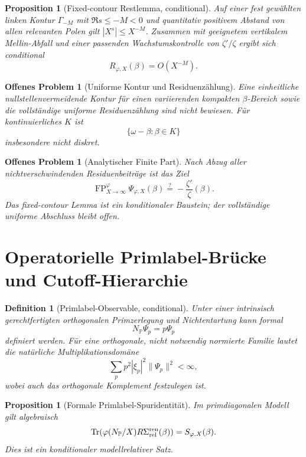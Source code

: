 \documentclass[11pt,a4paper]{amsart}
\newtheorem{proposition}[theorem]{Proposition}
\newtheorem{definition}[theorem]{Definition}
\newtheorem{openproblem}[theorem]{Offenes Problem}
\newcommand{\Tr}{\operatorname{Tr}}
\newcommand{\FP}{\operatorname{FP}}
\begin{document}
\begin{proposition}[Fixed-contour Restlemma, conditional]
\label{prop:fixed-contour}
Auf einer fest gewählten linken Kontur $\Gamma_{-M}$ mit
$\Re s\le-M<0$ und quantitativ positivem Abstand von allen relevanten Polen
gilt $|X^s|\le X^{-M}$. Zusammen mit geeignetem vertikalem Mellin-Abfall und
einer passenden Wachstumskontrolle von $\zeta'/\zeta$ ergibt sich conditional
\[
  R_{\varphi,X}(\beta)=O(X^{-M}).
\]
\end{proposition}

\begin{openproblem}[Uniforme Kontur und Residuenzählung]
\label{op:uniform-contour}
Eine einheitliche nullstellenvermeidende Kontur für einen variierenden
kompakten $\beta$-Bereich sowie die vollständige uniforme Residuenzählung sind
nicht bewiesen. Für kontinuierliches $K$ ist
\[
  \{\omega-\beta:\beta\in K\}
\]
insbesondere nicht diskret.
\end{openproblem}

\begin{openproblem}[Analytischer Finite Part]\label{op:analytic-fp}
Nach Abzug aller nichtverschwindenden Residuenbeiträge ist das Ziel
\[
  \FP_{X\to\infty}^{\varphi}\Psi_{\varphi,X}(\beta)
  \stackrel?=-\frac{\zeta'}{\zeta}(\beta).
\]
Das fixed-contour Lemma ist ein konditionaler Baustein; der vollständige
uniforme Abschluss bleibt offen.
\end{openproblem}

\section{Operatorielle Primlabel-Brücke und Cutoff-Hierarchie}

\begin{definition}[Primlabel-Observable, conditional]\label{def:np}
Unter einer intrinsisch gerechtfertigten orthogonalen Primzerlegung und
Nichtentartung kann formal
\[
  N_{\mathbb P}\Psi_p=p\Psi_p
\]
definiert werden. Für eine orthogonale, nicht notwendig normierte Familie
lautet die natürliche Multiplikationsdomäne
\[
  \sum_p p^2|\xi_p|^2\|\Psi_p\|^2<\infty,
\]
wobei auch das orthogonale Komplement festzulegen ist.
\end{definition}

\begin{proposition}[Formale Primlabel-Spuridentität]\label{prop:np-trace}
Im primdiagonalen Modell gilt algebraisch
\[
  \Tr\!\left(
    \varphi(N_{\mathbb P}/X)R\Sigma_{\rm rel}^{\rm ren}(\beta)
  \right)
  =S_{\varphi,X}(\beta).
\]
Dies ist ein konditionaler modellrelativer Satz.
\end{proposition}
\end{document}

